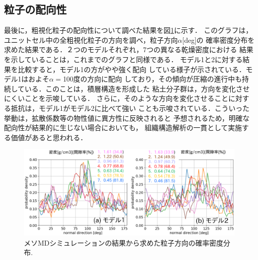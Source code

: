 \subsection{粒子の配向性}
最後に，粗視化粒子の配向性について調べた結果を図\ref{fig:fig9}に示す．
このグラフは，ユニットセル中の全粗視化粒子の方向を調べ，粒子方向$\alpha$[deg]の
確率密度分布を求めた結果である．２つのモデルそれぞれ，7つの異なる乾燥密度における
結果を示していることは，これまでのグラフと同様である．
モデル1と2に対する結果を比較すると，モデル1の方がやや強く配向
している様子が示されている．モデル1はおよそ$\alpha=$100度の方向に配向
しており，その傾向が圧縮の進行中も持続している．このことは，積層構造を形成した
粘土分子群は，方向を変化させにくいことを示唆している．
さらに，そのような方向を変化させることに対する抵抗は，モデル1がモデル2に比べて強い
ことも示唆されている．こういった挙動は，拡散係数等の物性値に異方性に反映されると
予想されるため，明確な配向性が結果的に生じない場合においても，
組織構造解析の一貫として実施する価値があると思われる．
\begin{figure}[h]
	\begin{center}
	\includegraphics[width=1.0\linewidth]{Figs/fig9.eps} 
	\end{center}
	\caption{
		メソMDシミュレーションの結果から求めた粒子方向の確率密度分布.
	} 
	\label{fig:fig9}
\end{figure}
